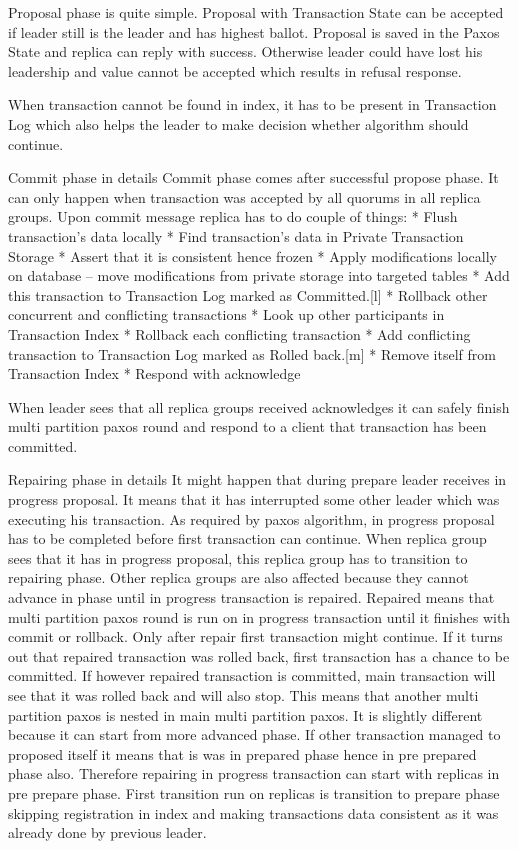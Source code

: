 Proposal phase is quite simple. Proposal with Transaction State can be accepted if leader still is the leader and has highest ballot. Proposal is saved in the Paxos State and replica can reply with success. Otherwise leader could have lost his leadership and value cannot be accepted which results in refusal response.


When transaction cannot be found in index, it has to be present in Transaction Log which also helps the leader to make decision whether algorithm should continue.


        Commit phase in details
Commit phase comes after successful propose phase. It can only happen when transaction was accepted by all quorums in all replica groups. Upon commit message replica has to do couple of things:
* Flush transaction’s data locally
   * Find transaction’s data in Private Transaction Storage 
   * Assert that it is consistent hence frozen
   * Apply modifications locally on database -- move modifications from private storage into targeted tables
* Add this transaction to Transaction Log marked as Committed.[l]
* Rollback other concurrent and conflicting transactions
   * Look up other participants in Transaction Index
   * Rollback each conflicting transaction
   * Add conflicting transaction to Transaction Log marked as Rolled back.[m]
* Remove itself from Transaction Index
* Respond with acknowledge


When leader sees that all replica groups received acknowledges it can safely finish multi partition paxos round and respond to a client that transaction has been committed.


Repairing phase in details
It might happen that during prepare leader receives in progress proposal. It means that it has interrupted some other leader which was executing his transaction. As required by paxos algorithm, in progress proposal has to be completed before first transaction can continue. When replica group sees that it has in progress proposal, this replica group has to transition to repairing phase. 
Other replica groups are also affected because they cannot advance in phase until in progress transaction is repaired. Repaired means that multi partition paxos round is run on in progress transaction until it finishes with commit or rollback. Only after repair first transaction might continue. If it turns out that repaired transaction was rolled back, first transaction has a chance to be committed. If however repaired transaction is committed, main transaction will see that it was rolled back and will also stop.
This means that another multi partition paxos is nested in main multi partition paxos. It is slightly different because it can start from more advanced phase.
If other transaction managed to proposed itself it means that is was in prepared phase hence in pre prepared phase also. Therefore repairing in progress transaction can start with replicas in pre prepare phase. First transition run on replicas is transition to prepare phase skipping registration in index and making transactions data consistent as it was already done by previous leader.


